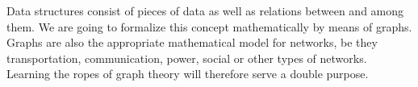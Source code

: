 \documentclass[a4paper]{book}
\theoremstyle{changebreak}                %
\begin{document}
\begin{center}
\end{center}

Data structures consist of pieces of data as
well as relations between and among them. We are going
to formalize this concept mathematically by means of
graphs. Graphs are also the appropriate mathematical
model for networks, be they transportation, communication, power,
social or other types of networks. Learning the ropes of graph theory
will therefore serve a double purpose.
\end{document}
